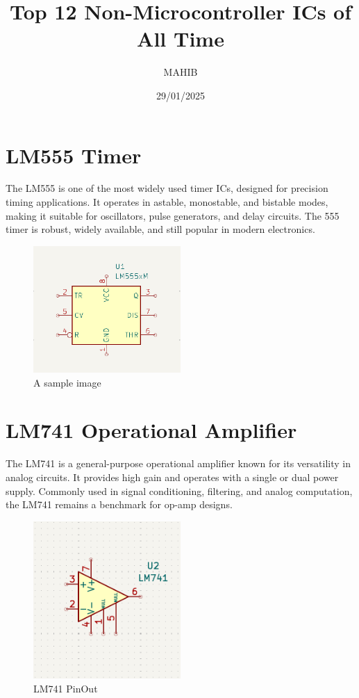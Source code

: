 \documentclass{article}
\begin{document}
\title{Top 12 Non-Microcontroller ICs of All Time}
\author{MAHIB}
\date{29/01/2025}
\maketitle

\section{LM555 Timer}
The LM555 is one of the most widely used timer ICs, designed for precision timing applications. It operates in astable, monostable, and bistable modes, making it suitable for oscillators, pulse generators, and delay circuits. The 555 timer is robust, widely available, and still popular in modern electronics.
\begin{figure}[H]
    \centering
    \includegraphics[width=0.5\textwidth]{img/LM555.png}
    \caption{A sample image}
    \label{fig:sample_image}
\end{figure}

\section{LM741 Operational Amplifier}
The LM741 is a general-purpose operational amplifier known for its versatility in analog circuits. It provides high gain and operates with a single or dual power supply. Commonly used in signal conditioning, filtering, and analog computation, the LM741 remains a benchmark for op-amp designs.
\begin{figure}[H]
    \centering
    \includegraphics[width=0.5\textwidth]{img/LM741.png}
    \caption{LM741 PinOut}
    \label{fig:LM741}
\end{figure}
\end{document}
